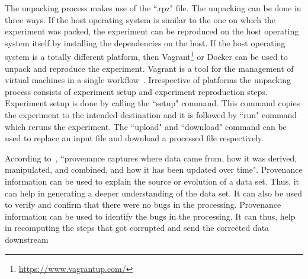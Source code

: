 The unpacking process makes use of the ``.rpz" file. The unpacking can be done in three ways. If the host operating system is similar to the one on which the experiment was packed, the experiment can be reproduced on the host operating system itself by installing the dependencies on the host. If the host operating system is a totally different platform, then Vagrant\footnote{\url{https://www.vagrantup.com/}} or Docker can be used to unpack and reproduce the experiment. Vagrant is a tool for the management of virtual machines in a single workflow~\cite{vagrant}. Irrespective of platforms the unpacking process consists of experiment setup and experiment reproduction steps. Experiment setup is done by calling the ``setup" command. This command copies the experiment to the intended destination and it is followed by ``run" command which reruns the experiment. The ``upload" and ``download" command can be used to replace an input file and download a processed file respectively.

According to~\cite{Ikeda:2010:PSP:1855795.1855800}, ``provenance captures where data came from, how it was derived, manipulated, and combined, and how it has been updated over time". Provenance information can be used to explain the source or evolution of a data set. Thus, it can help in generating a deeper understanding of the data set. It can also be used to verify and confirm that there were no bugs in the processing. Provenance information can be used to identify the bugs in the processing. It can thus, help in recomputing the steps that got corrupted and send the corrected data downstream~\cite{Ikeda:2010:PSP:1855795.1855800}
